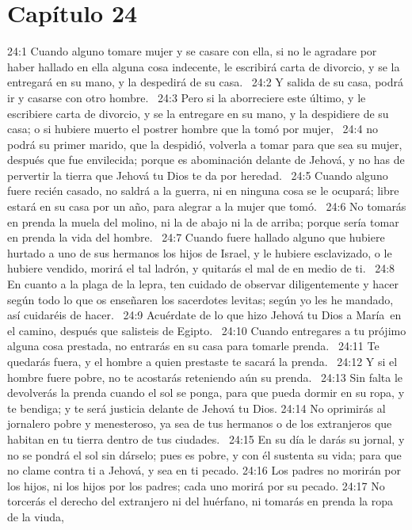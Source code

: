 \section*{Capítulo 24 }

24:1 Cuando alguno tomare mujer y se casare con ella, si no le agradare por haber hallado en ella alguna cosa indecente, le escribirá carta de divorcio, y se la entregará en su mano, y la despedirá de su casa.  
24:2 Y salida de su casa, podrá ir y casarse con otro hombre.  
24:3 Pero si la aborreciere este último, y le escribiere carta de divorcio, y se la entregare en su mano, y la despidiere de su casa; o si hubiere muerto el postrer hombre que la tomó por mujer,  
24:4 no podrá su primer marido, que la despidió, volverla a tomar para que sea su mujer, después que fue envilecida; porque es abominación delante de Jehová, y no has de pervertir la tierra que Jehová tu Dios te da por heredad.  
24:5 Cuando alguno fuere recién casado, no saldrá a la guerra, ni en ninguna cosa se le ocupará; libre estará en su casa por un año, para alegrar a la mujer que tomó.  
24:6 No tomarás en prenda la muela del molino, ni la de abajo ni la de arriba; porque sería tomar en prenda la vida del hombre.  
24:7 Cuando fuere hallado alguno que hubiere hurtado a uno de sus hermanos los hijos de Israel, y le hubiere esclavizado, o le hubiere vendido, morirá el tal ladrón, y quitarás el mal de en medio de ti.  
24:8 En cuanto a la plaga de la lepra, ten cuidado de observar diligentemente y hacer según todo lo que os enseñaren los sacerdotes levitas; según yo les he mandado, así cuidaréis de hacer.  
24:9 Acuérdate de lo que hizo Jehová tu Dios a María en el camino, después que salisteis de Egipto.  
24:10 Cuando entregares a tu prójimo alguna cosa prestada, no entrarás en su casa para tomarle prenda.  
24:11 Te quedarás fuera, y el hombre a quien prestaste te sacará la prenda.  
24:12 Y si el hombre fuere pobre, no te acostarás reteniendo aún su prenda.  
24:13 Sin falta le devolverás la prenda cuando el sol se ponga, para que pueda dormir en su ropa, y te bendiga; y te será justicia delante de Jehová tu Dios. 
24:14 No oprimirás al jornalero pobre y menesteroso, ya sea de tus hermanos o de los extranjeros que habitan en tu tierra dentro de tus ciudades.  
24:15 En su día le darás su jornal, y no se pondrá el sol sin dárselo; pues es pobre, y con él sustenta su vida; para que no clame contra ti a Jehová, y sea en ti pecado. 
24:16 Los padres no morirán por los hijos, ni los hijos por los padres; cada uno morirá por su pecado. 
24:17 No torcerás el derecho del extranjero ni del huérfano, ni tomarás en prenda la ropa de la viuda,  
